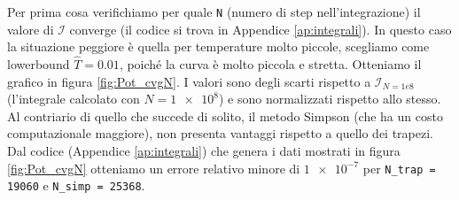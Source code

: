 \documentclass[a4paper, titlepage]{article}
\begin{document}
Per prima cosa verifichiamo per quale \texttt{N} (numero di step nell'integrazione) il valore di $\mathcal{I}$ converge (il codice si trova in Appendice \ref{ap:integrali}).
In questo caso la situazione peggiore è quella per temperature molto piccole, scegliamo come lowerbound $\hat T = 0.01$, poiché la curva è molto piccola e stretta.
Otteniamo il grafico in figura \ref{fig:Pot_cvgN}.
I valori sono degli scarti rispetto a $\mathcal{I}_{N = 1e8}$ (l'integrale calcolato con $N = \num{1e8}$) e sono normalizzati rispetto allo stesso.
Al contriario di quello che succede di solito, il metodo Simpson (che ha un costo computazionale maggiore), non presenta vantaggi rispetto a quello dei trapezi.
Dal codice (Appendice \ref{ap:integrali}) che genera i dati mostrati in figura \ref{fig:Pot_cvgN} otteniamo un errore relativo minore di $\num{1e-7}$ per \texttt{N\_trap = 19060} e \texttt{N\_simp = 25368}.
\end{document}
